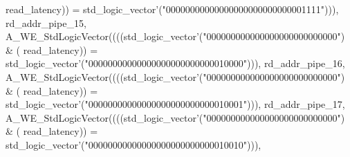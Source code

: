 \begin{DoxyCode}
{      read_latency}\textcolor{vhdlchar}{)}\textcolor{vhdlchar}{)} \textcolor{vhdlchar}{=} \textcolor{comment}{std\_logic\_vector}\textcolor{vhdlchar}{'}\textcolor{vhdlchar}{(}\textcolor{vhdllogic}{"00000000000000000000000000001111"}\textcolor{vhdlchar}{)}\textcolor{vhdlchar}{)}\textcolor{vhdlchar}{)}\textcolor{vhdlchar}{,} \textcolor{vhdlchar}{
      rd_addr_pipe_15}\textcolor{vhdlchar}{,} \textcolor{vhdlchar}{A\_WE\_StdLogicVector}\textcolor{vhdlchar}{(}\textcolor{vhdlchar}{(}\textcolor{vhdlchar}{(}\textcolor{vhdlchar}{(}\textcolor{comment}{std\_logic\_vector}\textcolor{vhdlchar}{'}\textcolor{vhdlchar}{(}\textcolor{vhdllogic}{"000000000000000000000000000"}\textcolor{vhdlchar}{)} \textcolor{vhdlchar}{&} \textcolor{vhdlchar}{(}\textcolor{vhdlchar}{
      read_latency}\textcolor{vhdlchar}{)}\textcolor{vhdlchar}{)} \textcolor{vhdlchar}{=} \textcolor{comment}{std\_logic\_vector}\textcolor{vhdlchar}{'}\textcolor{vhdlchar}{(}\textcolor{vhdllogic}{"00000000000000000000000000010000"}\textcolor{vhdlchar}{)}\textcolor{vhdlchar}{)}\textcolor{vhdlchar}{)}\textcolor{vhdlchar}{,} \textcolor{vhdlchar}{
      rd_addr_pipe_16}\textcolor{vhdlchar}{,} \textcolor{vhdlchar}{A\_WE\_StdLogicVector}\textcolor{vhdlchar}{(}\textcolor{vhdlchar}{(}\textcolor{vhdlchar}{(}\textcolor{vhdlchar}{(}\textcolor{comment}{std\_logic\_vector}\textcolor{vhdlchar}{'}\textcolor{vhdlchar}{(}\textcolor{vhdllogic}{"000000000000000000000000000"}\textcolor{vhdlchar}{)} \textcolor{vhdlchar}{&} \textcolor{vhdlchar}{(}\textcolor{vhdlchar}{
      read_latency}\textcolor{vhdlchar}{)}\textcolor{vhdlchar}{)} \textcolor{vhdlchar}{=} \textcolor{comment}{std\_logic\_vector}\textcolor{vhdlchar}{'}\textcolor{vhdlchar}{(}\textcolor{vhdllogic}{"00000000000000000000000000010001"}\textcolor{vhdlchar}{)}\textcolor{vhdlchar}{)}\textcolor{vhdlchar}{)}\textcolor{vhdlchar}{,} \textcolor{vhdlchar}{
      rd_addr_pipe_17}\textcolor{vhdlchar}{,} \textcolor{vhdlchar}{A\_WE\_StdLogicVector}\textcolor{vhdlchar}{(}\textcolor{vhdlchar}{(}\textcolor{vhdlchar}{(}\textcolor{vhdlchar}{(}\textcolor{comment}{std\_logic\_vector}\textcolor{vhdlchar}{'}\textcolor{vhdlchar}{(}\textcolor{vhdllogic}{"000000000000000000000000000"}\textcolor{vhdlchar}{)} \textcolor{vhdlchar}{&} \textcolor{vhdlchar}{(}\textcolor{vhdlchar}{
      read_latency}\textcolor{vhdlchar}{)}\textcolor{vhdlchar}{)} \textcolor{vhdlchar}{=} \textcolor{comment}{std\_logic\_vector}\textcolor{vhdlchar}{'}\textcolor{vhdlchar}{(}\textcolor{vhdllogic}{"00000000000000000000000000010010"}\textcolor{vhdlchar}{)}\textcolor{vhdlchar}{)}\textcolor{vhdlchar}{)}\textcolor{vhdlchar}{,} \textcolor{vhdlchar}{
}
\end{DoxyCode}
